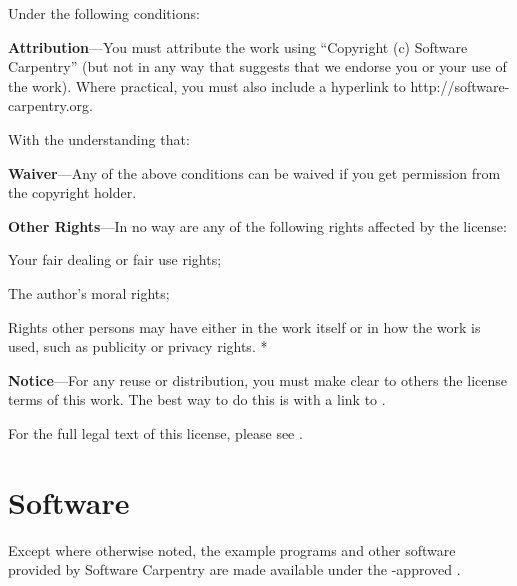 \documentclass{book}
\begin{document}
Under the following conditions:

\begin{swcitemize}
\item
  \textbf{Attribution}---You must attribute the work using ``Copyright
  (c) Software Carpentry'' (but not in any way that suggests that we
  endorse you or your use of the work). Where practical, you must also
  include a hyperlink to http://software-carpentry.org.
\end{swcitemize}

With the understanding that:

\begin{swcitemize}
\item
  \textbf{Waiver}---Any of the above conditions can be waived if you get
  permission from the copyright holder.
\item
  \textbf{Other Rights}---In no way are any of the following rights
  affected by the license:

  \begin{swcitemize2}
  \item
    Your fair dealing or fair use rights;
  \item
    The author's moral rights;
  \item
    Rights other persons may have either in the work itself or in how
    the work is used, such as publicity or privacy rights. *
   \end{swcitemize2}
\item
  \textbf{Notice}---For any reuse or distribution, you must make clear
  to others the license terms of this work. The best way to do this is
  with a link to
  .
\end{swcitemize}

For the full legal text of this license, please see
.

\section{Software}

Except where otherwise noted, the example programs and other software
provided by Software Carpentry are made available under the
-approved
.
\end{document}
